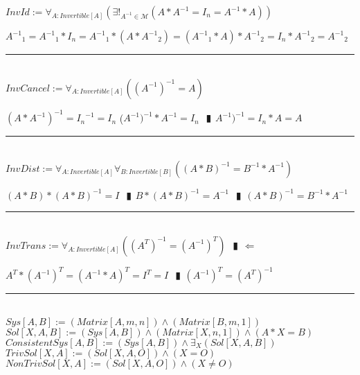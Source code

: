 \documentclass{book}
\newcommand{\abr}{:=}
\newcommand{\pipe}{$\phantom{(}\vrectangleblack\phantom{)}$}
\begin{document}
$InvId \abr \forall_{A : Invertible[A]}(\exists!_{A^{-1} \in \mathcal{M}}(A * A^{-1} = I_n = A^{-1} * A))$
\begin{enumerate}
  \lit ${A^{-1}}_{1} = {A^{-1}}_{1} * I_n = {A^{-1}}_{1} * (A * {A^{-1}}_{2}) = ({A^{-1}}_{1} * A) * {A^{-1}}_{2} = I_n * {A^{-1}}_{2} = {A^{-1}}_{2}$
\end{enumerate} \vspace{.75mm} \hrule \vspace{.75mm} \ \\ 

$InvCancel \abr \forall_{A : Invertible[A]}((A^{-1})^{-1} = A)$
\begin{enumerate}
  \lit $(A * A^{-1})^{-1} = {I_n}^{-1} = I_n$
  \lit ($A^{-1})^{-1} * A^{-1} = I_n$ \pipe $A^{-1})^{-1} = I_n * A = A$
\end{enumerate} \vspace{.75mm} \hrule \vspace{.75mm} \ \\ 

$InvDist \abr \forall_{A : Invertible[A]} \forall_{B : Invertible[B]}((A * B)^{-1} = B^{-1} * A^{-1})$
\begin{enumerate}
  \lit $(A * B) * (A * B)^{-1} = I$ \pipe $B * (A * B)^{-1} = A^{-1}$ \pipe $(A * B)^{-1} = B^{-1} * A^{-1}$
\end{enumerate} \vspace{.75mm} \hrule \vspace{.75mm} \ \\ 

$InvTrans \abr \forall_{A : Invertible[A]}((A^T)^{-1} = (A^{-1})^T)$ \pipe $\Leftarrow$
\begin{enumerate}
  \lit $A^T * (A^{-1})^T = (A^{-1} * A)^T = I^T = I$ \pipe $(A^{-1})^T = (A^T)^{-1}$
\end{enumerate} \vspace{.75mm} \hrule \vspace{.75mm} \ \\ 

$Sys[A, B] \abr (Matrix[A, m, n]) \land (Matrix[B, m, 1])$ \\
$Sol[X, A, B] \abr (Sys[A, B]) \land (Matrix[X, n, 1]) \land (A * X = B)$ \\
$ConsistentSys[A, B] \abr (Sys[A, B]) \land \exists_{X}(Sol[X, A, B])$ \\
$TrivSol[X, A] \abr (Sol[X, A, O]) \land (X = O)$ \\
$NonTrivSol[X, A] \abr (Sol[X, A, O]) \land (X \neq O)$ \\
\end{document}

